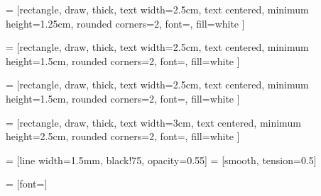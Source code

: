  = [rectangle, draw, thick,
                    text width=2.5cm, text centered, minimum height=1.25cm,
                    rounded corners=2, font=\footnotesize, fill=white ]

 = [rectangle, draw, thick,
                    text width=2.5cm, text centered, minimum height=1.5cm,
                    rounded corners=2, font=\footnotesize, fill=white ]

 = [rectangle, draw, thick,
                    text width=2.5cm, text centered, minimum height=1.5cm,
                    rounded corners=2, font=\footnotesize, fill=white ]

 = [rectangle, draw, thick, 
                    text width=3cm, text centered, minimum height=2.5cm,
                    rounded corners=2, font=\footnotesize, fill=white ]

 = [line width=1.5mm, black!75, opacity=0.55] %
 = [smooth, tension=0.5]

 = [font=\footnotesize]

